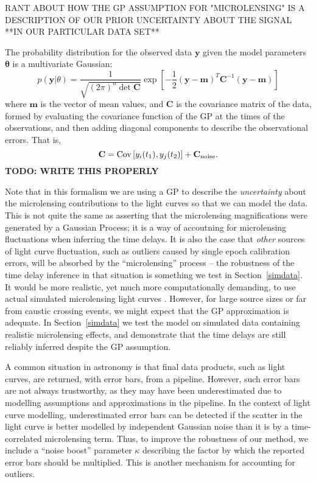 \documentclass[useAMS,usenatbib, a4paper]{mn2e} \usepackage{natbib}
\begin{document}
{RANT ABOUT HOW THE GP ASSUMPTION FOR "MICROLENSING" IS A DESCRIPTION OF OUR
PRIOR UNCERTAINTY ABOUT THE SIGNAL **IN OUR PARTICULAR DATA SET**}

The probability distribution for the observed data $\mathbf{y}$ given the
model parameters $\boldsymbol{\theta}$ is a multivariate Gaussian:
\begin{equation}
p(\mathbf{y} | \theta) = \frac{1}{\sqrt{(2\pi)^n \det \mathbf{C}}}
\exp\left[-\frac{1}{2}
(\mathbf{y} - \mathbf{m})^T\mathbf{C}^{-1}(\mathbf{y} - \mathbf{m})\right]
\end{equation}
where $\mathbf{m}$ is the vector of mean values, and $\mathbf{C}$ is the
covariance matrix of the data, formed by evaluating the covariance function of
the GP at the times of the observations, and then adding diagonal components
to describe the observational errors. That is,
\begin{equation}
\mathbf{C} = \textnormal{Cov}\left[y_i(t_1), y_j(t_2)\right] + \mathbf{C}_{\rm noise}.
\end{equation}
{\bf TODO: WRITE THIS PROPERLY}

Note that in this formalism we are using a  GP to describe the {\it
uncertainty} about the microlensing contributions to the light curves so that
we can model the data. This is not quite the same as asserting that the
microlensing magnifications were generated by a Gaussian Process; it is a way
of accoutning for microlensing fluctuations when inferring the time delays. It
is also the case that {\it other} sources of light curve fluctuation, such as
outliers caused by single epoch calibration errors, will be absorbed by the
``microlensing'' process -- the robustness of the time delay inference in that
situation is something we test in Section~\ref{simdata}. It would be more
realistic, yet much more computationally demanding, to use actual simulated
microlensing  light curves \citep{1999JCoAM.109..353W, 2008ApJ...676...80M,
2010NewA...15..181G}. However, for large source sizes or far from caustic
crossing events, we might expect that the GP approximation is adequate. In
Section~\ref{simdata} we test the model on simulated data containing realistic
microlensing effects, and demonstrate that the time delays are still reliably
inferred despite the GP assumption.

A common situation in astronomy is that final data products, such as light
curves, are returned, with error bars, from a pipeline. However, such error
bars are not always trustworthy, as they may have been underestimated due to
modelling assumptions and approximations in the pipeline. In the context of
light curve modelling, underestimated error bars can be detected if the
scatter in the light curve is better modelled by independent Gaussian noise
than it is by a time-correlated microlensing term. Thus, to improve the
robustness of our method, we include a ``noise boost'' parameter $\kappa$
describing the factor by which the reported error bars should be multiplied.
This is another mechanism for accounting for outliers.
\end{document}
